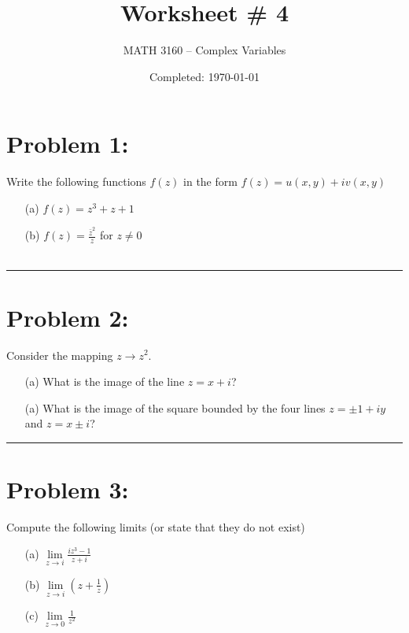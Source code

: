 \documentclass{article}
\title{Worksheet \# 4}
\author{
  MATH 3160 -- Complex Variables\\
  \myauthor
}
\date{Completed: \today}
\begin{document}
\maketitle %


\section*{Problem 1:}
Write the following functions $f(z)$ in the form $f(z) = u(x,y) + iv(x,y)$

\begin{enumerate}
  \item[(a)] $f(z) = z^3 + z + 1$
  \item[(b)] $f(z) = \frac{\bar{z}^2}{z}$ for $z \neq 0$
\end{enumerate}
\begin{align*}
\end{align*}

\vspace{1cm}
\hrule %

\newpage
\section*{Problem 2:}
Consider the mapping $z \xrightarrow{} z^2$.
\begin{enumerate}
\item[(a)] What is the image of the line $z  = x + i$?
\item[(a)] What is the image of the square bounded by the four lines $z  = \pm 1 + iy$ and $z = x \pm i$?  
\end{enumerate}

\vspace{1cm} %

\hrule

\newpage
\section*{Problem 3:}
Compute the following limits (or state that they do not exist)
\begin{enumerate}
  \item[(a)] $\lim\limits_{z \to i} \frac{iz^3 - 1}{z + i}$
  \item[(b)] $\lim\limits_{z \to i}\left(z + \frac{1}{z}\right)$
  \item[(c)] $\lim\limits_{z \to 0}\frac{1}{z^2}$
\end{enumerate}
\vspace{1cm} %
\end{document}
